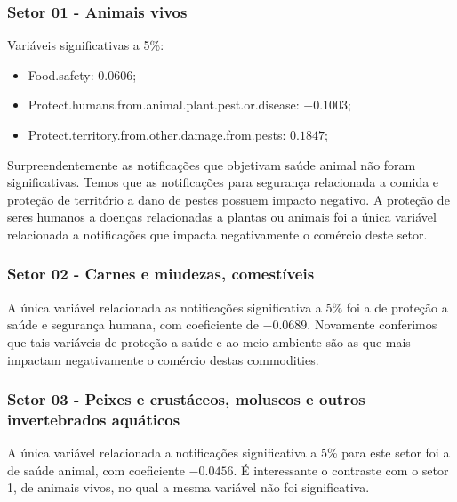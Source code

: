 \subsubsection{Setor 01 - Animais vivos}


 

Variáveis  significativas a 5\%:
\begin{itemize}
    \item Food.safety: $0.0606$;
    \item Protect.humans.from.animal.plant.pest.or.disease: $-0.1003$;
    \item Protect.territory.from.other.damage.from.pests: $0.1847$;
\end{itemize}

Surpreendentemente as notificações que objetivam saúde animal não foram significativas. Temos que as notificações para segurança relacionada a comida e proteção de território a dano de pestes possuem impacto negativo. A proteção de seres humanos a doenças relacionadas a plantas ou animais foi a única variável relacionada a notificações que impacta negativamente o comércio deste setor. 

\subsubsection{Setor 02 - Carnes e miudezas, comestíveis}


 

A única variável relacionada as notificações significativa a 5\% foi a de proteção a saúde e segurança humana, com coeficiente de $-0.0689$. Novamente conferimos que tais variáveis de proteção a saúde e ao meio ambiente são as que mais impactam negativamente o comércio destas commodities.

\newpage

\subsubsection{Setor 03 - Peixes e crustáceos, moluscos e outros invertebrados aquáticos}


 


A única variável relacionada a notificações significativa a 5\% para este setor foi a de saúde animal, com coeficiente $-0.0456$. É interessante o contraste com o setor 1, de animais vivos, no qual a mesma variável não foi significativa. 

